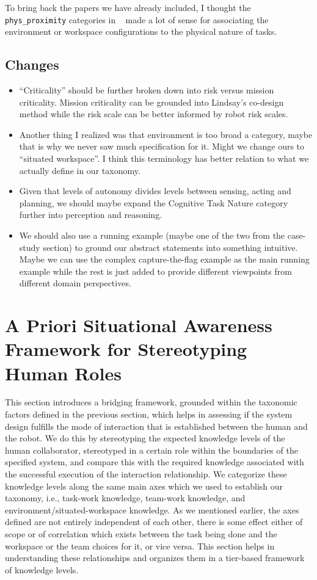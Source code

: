 \documentclass[letterpaper, 10 pt, conference]{ieeeconf} %
\theoremstyle{definition} \newtheorem{definition}{Definition}
\newcommand{\citet}[1]{\citeauthor{#1}~\cite{#1}}
\begin{document}
To bring back the papers we have already included, I thought the
\texttt{phys\_proximity} categories in \citet{Yanco2004updated} made a lot of
sense for associating the environment or workspace configurations to the
physical nature of tasks.

\subsection{Changes}
\begin{itemize}{}
  \item ``Criticality'' should be further broken down into risk versus mission
    criticality. Mission criticality can be grounded into Lindsay's co-design
    method while the risk scale can be better informed by robot risk scales.
  \item Another thing I realized was that environment is too broad a category,
    maybe that is why we never saw much specification for it. Might we change
    ours to ``situated workspace''. I think this terminology has better relation
    to what we actually define in our taxonomy.
  \item Given that levels of autonomy divides levels between sensing, acting and
    planning, we should maybe expand the Cognitive Task Nature category further
    into perception and reasoning.
  \item We should also use a running example (maybe one of the two from the
    case-study section) to ground our abstract statements into something
    intuitive. Maybe we can use the complex capture-the-flag example as the main
    running example while the rest is just added to provide different viewpoints
    from different domain perspectives.
\end{itemize}

\section{A Priori Situational Awareness Framework for Stereotyping Human Roles}

This section introduces a bridging framework, grounded within the taxonomic
factors defined in the previous section, which helps in assessing if the system
design fulfills the mode of interaction that is established between the human
and the robot. We do this by stereotyping the expected knowledge levels of the
human collaborator, stereotyped in a certain role within the boundaries of the
specified system, and compare this with the required knowledge associated with
the successful execution of the interaction relationship. We categorize these
knowledge levels along the same main axes which we used to establish our
taxonomy, i.e., task-work knowledge, team-work knowledge, and
environment/situated-workspace knowledge. As we mentioned earlier, the axes
defined are not entirely independent of each other, there is some effect either
of scope or of correlation which exists between the task being done and the
workspace or the team choices for it, or vice versa. This section helps in
understanding these relationships and organizes them in a tier-based framework
of knowledge levels.
\end{document}
